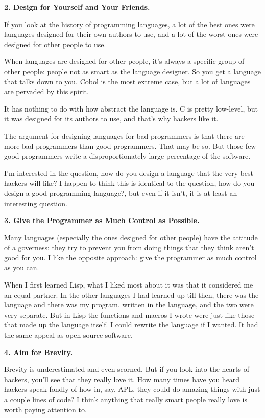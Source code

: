 \textbf{2. Design for Yourself and Your Friends.}

If you look at the history of programming languages, a lot of the best
ones were languages designed for their own authors to use, and a lot of
the worst ones were designed for other people to use.

When languages are designed for other people, it's always a specific
group of other people: people not as smart as the language designer. So
you get a language that talks down to you. Cobol is the most extreme
case, but a lot of languages are pervaded by this spirit.

It has nothing to do with how abstract the language is. C is pretty
low-level, but it was designed for its authors to use, and that's why
hackers like it.

The argument for designing languages for bad programmers is that there
are more bad programmers than good programmers. That may be so. But
those few good programmers write a disproportionately large percentage
of the software.

I'm interested in the question, how do you design a language that the
very best hackers will like? I happen to think this is identical to the
question, how do you design a good programming language?, but even if it
isn't, it is at least an interesting question.

\textbf{3. Give the Programmer as Much Control as Possible.}

Many languages (especially the ones designed for other people) have the
attitude of a governess: they try to prevent you from doing things that
they think aren't good for you. I like the opposite approach: give the
programmer as much control as you can.

When I first learned Lisp, what I liked most about it was that it
considered me an equal partner. In the other languages I had learned up
till then, there was the language and there was my program, written in
the language, and the two were very separate. But in Lisp the functions
and macros I wrote were just like those that made up the language
itself. I could rewrite the language if I wanted. It had the same appeal
as open-source software.

\textbf{4. Aim for Brevity.}

Brevity is underestimated and even scorned. But if you look into the
hearts of hackers, you'll see that they really love it. How many times
have you heard hackers speak fondly of how in, say, APL, they could do
amazing things with just a couple lines of code? I think anything that
really smart people really love is worth paying attention to.

